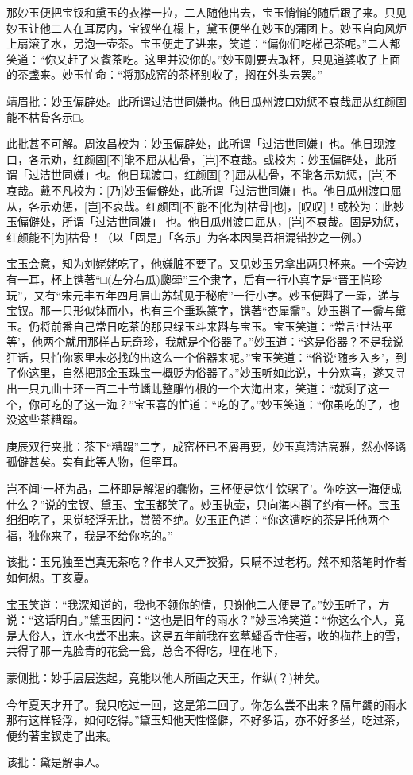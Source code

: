 \begin{parag}
    那妙玉便把宝钗和黛玉的衣襟一拉，二人随他出去，宝玉悄悄的随后跟了来。只见妙玉让他二人在耳房内，宝钗坐在榻上，黛玉便坐在妙玉的蒲团上。妙玉自向风炉上扇滚了水，另泡一壶茶。宝玉便走了进来，笑道：“偏你们吃梯己茶呢。”二人都笑道：“你又赶了来飺茶吃。这里并没你的。”妙玉刚要去取杯，只见道婆收了上面的茶盏来。妙玉忙命：“将那成窑的茶杯别收了，搁在外头去罢。”\begin{note}靖眉批：妙玉偏辟处。此所谓过洁世同嫌也。他日瓜州渡口劝惩不哀哉屈从红颜固能不枯骨各示□。\end{note}\begin{subnote}此批甚不可解。周汝昌校为：妙玉偏辟处，此所谓「过洁世同嫌」也。他日现渡口，各示劝，红颜固[不]能不屈从枯骨，[岂]不哀哉。或校为：妙玉偏辟处，此所谓「过洁世同嫌」也。他日现渡口，红颜固[？]屈从枯骨，不能各示劝惩，[岂]不哀哉。戴不凡校为：[乃]妙玉偏僻处，此所谓「过洁世同嫌」也。他日瓜州渡口屈从，各示劝惩，[岂]不哀哉。红颜固[不]能不[化为]枯骨[也]，[叹叹]！或校为：此妙玉偏僻处，所谓「过洁世同嫌」 也。他日瓜州渡口屈从，[岂]不哀哉。固是劝惩，红颜能不[为]枯骨！（以「固是」「各示」为各本因吴音相混错抄之一例。）\end{subnote}宝玉会意，知为刘姥姥吃了，他嫌脏不要了。又见妙玉另拿出两只杯来。一个旁边有一耳，杯上镌著“□(左分右瓜)瓟斝”三个隶字，后有一行小真字是“晋王恺珍玩”，又有“宋元丰五年四月眉山苏轼见于秘府”一行小字。妙玉便斟了一斝，递与宝钗。那一只形似钵而小，也有三个垂珠篆字，镌著“杏犀䀉”。妙玉斟了一䀉与黛玉。仍将前番自己常日吃茶的那只绿玉斗来斟与宝玉。宝玉笑道：“常言‘世法平等’，他两个就用那样古玩奇珍，我就是个俗器了。”妙玉道：“这是俗器？不是我说狂话，只怕你家里未必找的出这么一个俗器来呢。”宝玉笑道：“俗说‘随乡入乡’，到了你这里，自然把那金玉珠宝一概贬为俗器了。”妙玉听如此说，十分欢喜，遂又寻出一只九曲十环一百二十节蟠虬整雕竹根的一个大海出来，笑道：“就剩了这一个，你可吃的了这一海？”宝玉喜的忙道：“吃的了。”妙玉笑道：“你虽吃的了，也没这些茶糟蹋。\begin{note}庚辰双行夹批：茶下“糟蹋”二字，成窑杯已不屑再要，妙玉真清洁高雅，然亦怪谲孤僻甚矣。实有此等人物，但罕耳。\end{note}岂不闻‘一杯为品，二杯即是解渴的蠢物，三杯便是饮牛饮骡了’。你吃这一海便成什么？”说的宝钗、黛玉、宝玉都笑了。妙玉执壶，只向海内斟了约有一杯。宝玉细细吃了，果觉轻浮无比，赏赞不绝。妙玉正色道：“你这遭吃的茶是托他两个福，独你来了，我是不给你吃的。”\begin{note}该批：玉兄独至岂真无茶吃？作书人又弄狡猾，只瞒不过老朽。然不知落笔时作者如何想。丁亥夏。\end{note}宝玉笑道：“我深知道的，我也不领你的情，只谢他二人便是了。”妙玉听了，方说：“这话明白。”黛玉因问：“这也是旧年的雨水？”妙玉冷笑道：“你这么个人，竟是大俗人，连水也尝不出来。这是五年前我在玄墓蟠香寺住著，收的梅花上的雪，共得了那一鬼脸青的花瓮一瓮，总舍不得吃，埋在地下，\begin{note}蒙侧批：妙手层层迭起，竟能以他人所画之天王，作纵(？)神矣。\end{note}今年夏天才开了。我只吃过一回，这是第二回了。你怎么尝不出来？隔年蠲的雨水那有这样轻浮，如何吃得。”黛玉知他天性怪僻，不好多话，亦不好多坐，吃过茶，便约著宝钗走了出来。\begin{note}该批：黛是解事人。\end{note}
\end{parag}


